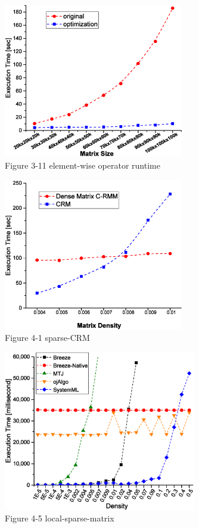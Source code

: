 \documentclass[onecolumn]{ieeetran}
\begin{document}
\begin{figure}[ht]
  \centering
  \captionsetup{justification=centering}
  \includegraphics[width=0.7\textwidth]{Figure_3-11_element-wise-op.eps}
  \caption{Figure 3-11 element-wise operator runtime}\label{Figure_3-11_element-wise operator runtime}
\end{figure}

\begin{figure}[ht]
  \centering\captionsetup{justification=centering}
  \includegraphics[width=0.7\textwidth]{Figure_4-1_sparse-CRM.eps}
  \caption{Figure 4-1 sparse-CRM}\label{Figure_4-1_sparse-CRM}
\end{figure}

\begin{figure}[ht]
  \centering\captionsetup{justification=centering}
  \includegraphics[width=0.75\textwidth]{Figure_4-5_local-sparse-matrix.eps}
  \caption{Figure 4-5 local-sparse-matrix}\label{Figure_4-5_local-sparse-matrix}
\end{figure}
\end{document}
